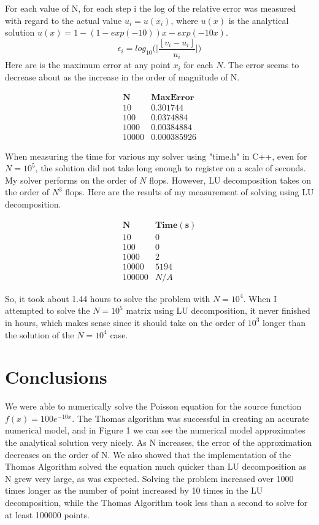 \documentclass[11pt]{article}
\begin{document}
For each value of N, for each step i the log of the relative error was measured with regard to the actual value $u_i=u(x_i)$, where $u(x)$ is the analytical solution $u(x)=1-(1-exp(-10))x-exp(-10x)$.
$$\epsilon_i=log_{10}\bigg(\bigg|\frac{[v_i-u_i]}{u_i}\bigg|\bigg)$$
Here are is the maximum error at any point $x_i$ for each $N$. The error seems to decrease about as the increase in the order of magnitude of N.

$$
\begin{array}{|c|c|}
\mathbf{N} & \mathbf{Max Error}\\
\hline
10 & 0.301744\\
100 & 0.0374884\\
1000 & 0.00384884\\
10000 & 0.000385926
\end{array}
$$

When measuring the time for various my solver using "time.h" in C++, even for $N=10^5$, the solution did not take long enough to register on a scale of seconds. My solver performs on the order of $N$ flops. However, LU decomposition takes on the order of $N^3$ flops. Here are the results of my measurement of solving using LU decomposition.

$$
\begin{array}{|c|c|}
\mathbf{N} & \mathbf{Time (s)}\\
\hline
10 & 0\\
100 & 0\\
1000 & 2\\
10000 & 5194\\
100000 & N/A
\end{array}
$$

So, it took about 1.44 hours to solve the problem with $N=10^4$. When I attempted to solve the $N=10^5$ matrix using LU decomposition, it never finished in hours, which makes sense since it should take on the order of $10^3$ longer than the solution of the $N=10^4$ case.

\section{Conclusions}
We were able to numerically solve the Poisson equation for the source function  $f(x)=100e^{-10x}$. The Thomas algorithm was successful in creating an accurate numerical model, and in Figure 1 we can see the numerical model approximates the analytical solution very nicely. As N increases, the error of the approximation decreases on the order of N. We also showed that the implementation of the Thomas Algorithm solved the equation much quicker than LU decomposition as N grew very large, as was expected. Solving the problem increased over 1000 times longer as the number of point increased by 10 times in the LU decomposition, while the Thomas Algorithm took less than a second to solve for at least 100000 points.
\end{document}
